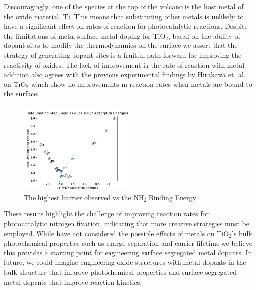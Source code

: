 \documentclass[catalysts,article,submit,moreauthors,pdftex,10pt,a4paper]{mdpi}
\theoremstyle{mdpi}
\newcounter{ex}
\newcounter{re}
\theoremstyle{mdpidefinition}
\begin{document}
Discouragingly, one of the species at the top of the volcano is the host metal of the oxide material, Ti. This means that substituting other metals is unlikely to have a significant effect on rates of reaction for photocatalytic reactions. Despite the limitations of metal surface metal doping for TiO$_2$, based on the ability of dopant sites to modify the thermodynamics on the surface we assert that the strategy of generating dopant sites is a fruitful path forward for improving the reactivity of oxides. The lack of improvement in the rate of reaction with metal addition also agrees with the previous experimental findings by Hirakawa et. al.\cite{Hirakawa_2017} on TiO$_2$ which show no improvements in reaction rates when metals are bound to the surface.


\begin{figure}
    \centering
    \includegraphics[width=0.5\textwidth]{Images/NH2_v_rate_limiting.pdf}
    
    \caption{The highest barrier observed vs the NH$_2$ Binding Energy}
    \label{fig:NH2_limiting}
\end{figure}

These results highlight the challenge of improving reaction rates for photocatalytic nitrogen fixation, indicating that more creative strategies must be employed. While have not considered the possible effects of metals on TiO$_2$'s bulk photochemical properties such as charge separation and carrier lifetime we believe this provides a starting point for engineering surface segregated metal dopants. In future, we could imagine engineering oxide structures with metal dopants in the bulk structure that improve photochemical properties and surface segregated metal dopants that improve reaction kinetics.
\end{document}
